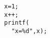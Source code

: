 \documentclass{article}
\begin{document}
\begin{verbatim}
  x=1;
  x++;
  printf(
    "x=%d",x);
\end{verbatim}
\end{document}
